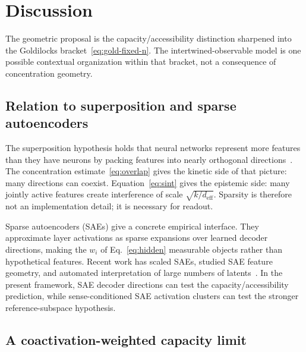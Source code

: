 \documentclass[
  aps,
  reprint,
  superscriptaddress,
  floatfix,
  nofootinbib,
  longbibliography
]{revtex4-2}
\newcommand{\deff}{d_{\mathrm{eff}}}
\begin{document}
\section{Discussion}
\label{sec:discussion}

The geometric proposal is the capacity/accessibility distinction sharpened
into the Goldilocks bracket~\eqref{eq:gold-fixed-n}.  The intertwined-observable
model is one possible contextual organization within that bracket, not a
consequence of concentration geometry.

\subsection{Relation to superposition and sparse autoencoders}
\label{sec:superposition}

The superposition hypothesis holds that neural networks represent more
features than they have neurons by packing features into nearly
orthogonal directions~\cite{elhage2022superposition,bricken2023monosemanticity}. The concentration
estimate~\eqref{eq:overlap} gives the kinetic side of that picture:
many directions can coexist. Equation~\eqref{eq:sint} gives the
epistemic side: many jointly active features create interference of
scale $\sqrt{k/\deff}$. Sparsity is therefore not an implementation
detail; it is necessary for readout.

Sparse autoencoders (SAEs) give a concrete empirical interface. They
approximate layer activations as sparse expansions over learned decoder
directions, making the $w_i$ of Eq.~\eqref{eq:hidden} measurable
objects rather than hypothetical features. Recent work has scaled SAEs,
studied SAE feature geometry, and automated interpretation of large
numbers of latents~\cite{gao2025scaling,li2025geometry,paulo2025automatically,shu2025survey}. In the
present framework, SAE decoder directions can test the
capacity/accessibility prediction, while sense-conditioned SAE
activation clusters can test the stronger reference-subspace hypothesis.

\subsection{A coactivation-weighted capacity limit}
\label{sec:capacity-limit}
\end{document}
